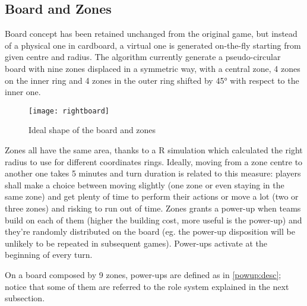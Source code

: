 		\subsection{Board and Zones}\label{design:board}
		
			Board concept has been retained unchanged from the original game, but instead of a physical one in cardboard, a virtual one is generated on-the-fly starting from given centre and radius.
			The algorithm currently generate a pseudo-circular board with nine zones displaced in a symmetric way, with a central zone, 4 zones on the inner ring and 4 zones in the outer ring shifted by 45° with respect to the inner one.
			
			\begin{figure}
				\centering
				\texttt{[image: rightboard]}
				\caption{Ideal shape of the board and zones}
			\end{figure}
			
			Zones all have the same area, thanks to a R simulation which calculated the right radius to use for different coordinates rings.
			Ideally, moving from a zone centre to another one takes 5 minutes and turn duration is related to this measure: players shall make a choice between moving slightly (one zone or even staying in the same zone) and get plenty of time to perform their actions or move a lot (two or three zones) and risking to run out of time.
			Zones grants a power-up when teams build on each of them (higher the building cost, more useful is the power-up) and they're randomly distributed on the board (eg. the power-up disposition will be unlikely to be repeated in subsequent games).
			Power-ups activate at the beginning of every turn.
			
			On a board composed by 9 zones, power-ups are defined as in \autoref{powup:desc}; notice that some of them are referred to the role system explained in the next subsection.
			
